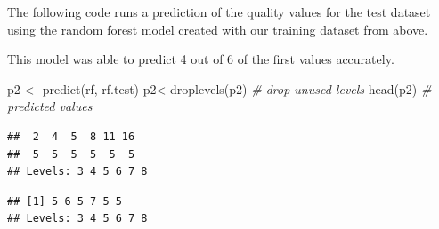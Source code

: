 \documentclass[
]{book}
\newenvironment{Shaded}{\begin{snugshade}}{\end{snugshade}}
\newcommand{\CommentTok}[1]{\textcolor[rgb]{0.56,0.35,0.01}{\textit{#1}}}
\newcommand{\FunctionTok}[1]{\textcolor[rgb]{0.00,0.00,0.00}{#1}}
\newcommand{\NormalTok}[1]{#1}
\newcommand{\OtherTok}[1]{\textcolor[rgb]{0.56,0.35,0.01}{#1}}
\newcommand{\SpecialCharTok}[1]{\textcolor[rgb]{0.00,0.00,0.00}{#1}}
\begin{document}
The following code runs a prediction of the quality values for the test dataset using the random forest model created with our training dataset from above.

This model was able to predict 4 out of 6 of the first values accurately.

\begin{Shaded}
\begin{Highlighting}[]
\NormalTok{p2 }\OtherTok{\textless{}{-}} \FunctionTok{predict}\NormalTok{(rf, rf.test)}
\NormalTok{p2}\OtherTok{\textless{}{-}}\FunctionTok{droplevels}\NormalTok{(p2) }\CommentTok{\# drop unused levels}
\FunctionTok{head}\NormalTok{(p2) }\CommentTok{\# predicted values}
\end{Highlighting}
\end{Shaded}

\begin{verbatim}
##  2  4  5  8 11 16 
##  5  5  5  5  5  5 
## Levels: 3 4 5 6 7 8
\end{verbatim}

\begin{Shaded}
\end{Shaded}

\begin{verbatim}
## [1] 5 6 5 7 5 5
## Levels: 3 4 5 6 7 8
\end{verbatim}

\begin{Shaded}
\end{Shaded}
\end{document}
